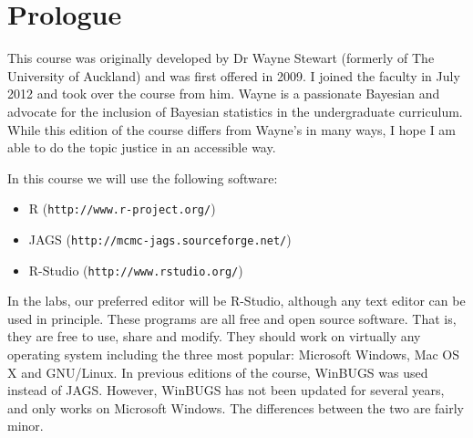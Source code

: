 \section{Prologue}

This course was originally developed by Dr Wayne Stewart (formerly of The
University of
Auckland) and was first offered in 2009. I joined the faculty in July 2012
and took over the course from him. Wayne is a passionate Bayesian and advocate
for the inclusion of Bayesian statistics in the undergraduate curriculum.
While this edition of the course differs from Wayne's in many ways, I hope I am
able to do the topic justice in an accessible way.

In this course we will use the following software:
\begin{itemize}
\item R ({\tt http://www.r-project.org/}) \\
\item JAGS ({\tt http://mcmc-jags.sourceforge.net/}) \\
\item R-Studio ({\tt http://www.rstudio.org/})
\end{itemize}
In the labs, our preferred editor will be R-Studio, although any text editor
can be used in principle. These programs are all free and open source software.
That is, they are free to use, share and modify. They should work on
virtually any operating system including the three most popular:
Microsoft Windows, Mac OS X and GNU/Linux. In previous editions of the course,
WinBUGS was used instead of JAGS. However, WinBUGS has not been updated for
several years, and only works on Microsoft Windows. The differences between
the two are fairly minor.

